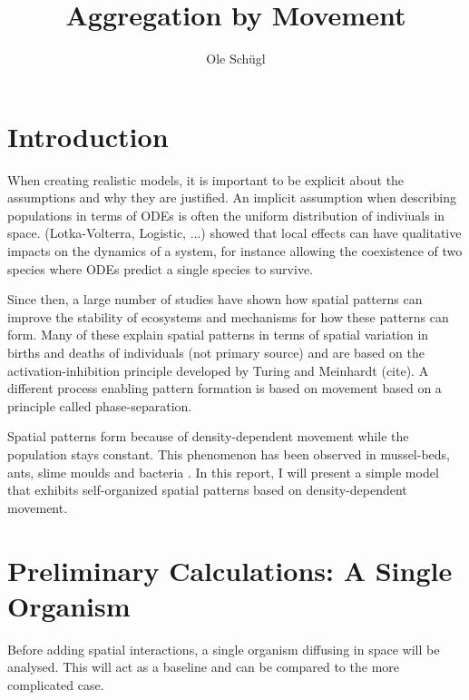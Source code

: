 \documentclass{article}
\title{Aggregation by Movement}
\author{Ole Schügl}
\begin{document}
\maketitle

\section{Introduction}
When creating realistic models, it is important to be explicit about the assumptions and why they are justified.
An implicit assumption when describing populations in terms of ODEs is often the uniform distribution of indiviuals in space. (Lotka-Volterra, Logistic, ...)
\autocite{durrettImportanceBeingDiscrete1994} showed that local effects can have qualitative impacts on the dynamics of a system, for instance allowing the coexistence of two species where ODEs predict a single species to survive.

Since then, a large number of studies have shown how spatial patterns can improve the stability of ecosystems and mechanisms for how these patterns can form.
Many of these explain spatial patterns in terms of spatial variation in births and deaths of individuals \autocite{liuPhaseSeparationDriven2016} (not primary source) and are based on the activation-inhibition principle developed by Turing and Meinhardt (cite).
A different process enabling pattern formation is based on movement based on a principle called phase-separation. 

Spatial patterns form because of density-dependent movement while the population stays constant. 
This phenomenon has been observed in mussel-beds, ants, slime moulds and bacteria \autocite{liuPhaseSeparationDriven2016}.
In this report, I will present a simple model that exhibits self-organized spatial patterns based on density-dependent movement.

\section{Preliminary Calculations: A Single Organism}
Before adding spatial interactions, a single organism diffusing in space will be analysed.
This will act as a baseline and can be compared to the more complicated case.
\end{document}
